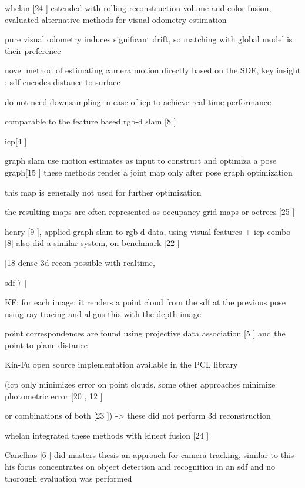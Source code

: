 whelan [24 \cite{Whelan13Robust}] estended with rolling reconstruction volume and color fusion, evaluated alternative methods for visual odometry estimation

pure visual odometry induces significant drift, so matching with global model is their preference

novel method of estimating camera motion directly based on the SDF, key insight : sdf encodes distance to surface

do not need downsampling in case of icp to achieve real time performance

comparable to the feature based rgb-d slam [8 \cite{Endres12Evaluation}]

icp[4 \cite{Besl92Method}]

graph slam use motion estimates as input to construct and optimiza a pose graph[15 \cite{Kummerle11G}] these methods render a joint map only after pose graph optimization

this map is generally not used for further optimization

the resulting maps are often represented as occupancy grid maps or octrees [25 \cite{Wurm10Octomap}]

henry [9 \cite{Henry10Rgb}], applied graph slam to rgb-d data, using visual features + icp combo [8] also did a similar system, on benchmark [22 \cite{Sturm12Benchmark}]

[18 \cite{Newcombe11Kinectfusion} dense 3d recon possible with realtime, 

sdf[7 \cite{Curless96Volumetric}]

KF: for each image:
it renders a point cloud from the sdf at the previous pose using ray tracing and aligns this with the depth image


point correspondences are found using projective data association [5 \cite{Blais95Registering}] and the point to plane distance

Kin-Fu open source implementation available in the PCL library

(icp only minimizes error on point clouds, some other approaches minimize photometric error [20 \cite{Steinbrucker11Real}, 12 \cite{Kerl13Robust}]

or combinations of both [23 \cite{Tykkala11Direct}]) -> these did not perform 3d reconstruction

whelan integrated these methods with kinect fusion [24 \cite{Whelan13Robust}]

Canelhas [6 \cite{Canelhas12Scene}] did masters thesis an approach for camera tracking, similar to this
his focus concentrates on object detection and recognition in an sdf and no thorough evaluation was performed

